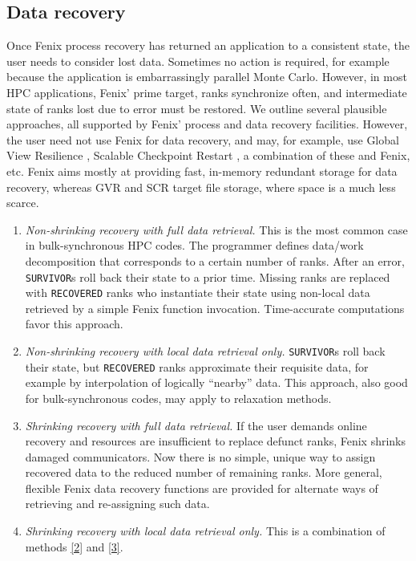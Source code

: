 \subsection{Data recovery}
Once Fenix process recovery has returned an application to a consistent state, the user 
needs to consider lost data.
Sometimes no action is required, for example because the application
is embarrassingly parallel Monte Carlo.
However, in most HPC applications,  Fenix' prime target, ranks synchronize often, 
and intermediate state of ranks lost due to error must be restored.
We outline several plausible approaches, all supported by Fenix'
process and data recovery facilities.
However, the user  need not use Fenix for data recovery, and may, for example,
use Global View Resilience \cite{chien2015versioned}, Scalable Checkpoint Restart
\cite{moody2010detailed}, a combination of these and Fenix, etc.
Fenix aims mostly at providing fast, in-memory redundant storage for data recovery,
whereas GVR and SCR target file storage, where space is a much less scarce.
\begin{enumerate}
\item \textit{Non-shrinking recovery with full data retrieval.} \label{1}
This is the most common case in bulk-synchronous HPC codes. 
The programmer defines data/work decomposition that corresponds to a certain
number of ranks.
After an error, \texttt{SURVIVOR}s roll back their state to a prior time.
Missing ranks are replaced with \texttt{RECOVERED} ranks who instantiate their
state using non-local data retrieved by a simple Fenix function invocation.
Time-accurate computations favor this approach.
\item \textit{Non-shrinking recovery with local data retrieval only.}\label{2}
\texttt{SURVIVOR}s roll back their state, but 
\texttt{RECOVERED} ranks approximate their requisite data,
for example by interpolation of logically ``nearby'' data.
This approach, also good for bulk-synchronous codes, may apply to relaxation methods.
\item \textit{Shrinking recovery with full data retrieval.}\label{3}
If the user demands online recovery and
resources are insufficient to replace defunct ranks, 
Fenix shrinks damaged communicators.
Now there is no simple, unique way to 
assign recovered data to the reduced number of remaining ranks.
More general, flexible Fenix data recovery functions are provided for alternate
ways of retrieving and re-assigning such data.
\item \textit{Shrinking recovery with local data retrieval only.}\label{4}
This is a combination of methods \ref{2} and \ref{3}.
\end{enumerate}

